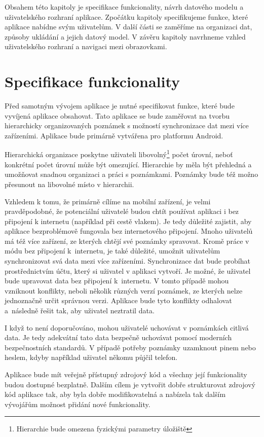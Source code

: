 \documentclass[czech, bc, kiv, he, iso690numb]{fasthesis}
\begin{document}
Obsahem této kapitoly je specifikace funkcionality, návrh datového modelu a uživatelského rozhraní aplikace. Zpočátku kapitoly specifikujeme funkce, které aplikace nabídne svým uživatelům. V další části se zaměříme na organizaci dat, způsoby ukládání a jejich datový model. V závěru kapitoly navrhneme vzhled uživatelského rozhraní a navigaci mezi obrazovkami.

\section{Specifikace funkcionality}

Před samotným vývojem aplikace je nutné specifikovat funkce, které bude vyvíjená aplikace obsahovat. Tato aplikace se bude zaměřovat na tvorbu hierarchicky organizovaných poznámek s možností synchronizace dat mezi více zařízeními. Aplikace bude primárně vytvářena pro platformu Android.

Hierarchická organizace poskytne uživateli libovolný\footnote{Hierarchie bude omezena fyzickými parametry úložiště} počet úrovní, neboť konkrétní počet úrovní může být omezující. Hierarchie by měla být přehledná a umožňovat snadnou organizaci a práci s poznámkami. Poznámky bude též možno přesunout na libovolné místo v hierarchii.

Vzhledem k tomu, že primárně cílíme na mobilní zařízení, je velmi pravděpodobné, že potenciální uživatelé budou chtít používat aplikaci i bez připojení k internetu (například při cestě vlakem). Je tedy důležité zajistit, aby aplikace bezproblémově fungovala bez internetového připojení. Mnoho uživatelů má též více zařízení, ze kterých chtějí své poznámky spravovat. Kromě práce v módu bez připojení k~internetu, je také důležité, umožnit uživatelům synchronizovat svá data mezi více zařízeními. Synchronizace dat bude probíhat prostřednictvím účtu, který si uživatel v aplikaci vytvoří. Je možné, že uživatel bude upravovat data bez připojení k~internetu. V tomto případě mohou vzniknout konflikty, neboli několik různých verzí poznámek, ze kterých nelze jednoznačně určit správnou verzi. Aplikace bude tyto konflikty odhalovat a~následně řešit tak, aby uživatel neztratil data.

I když to není doporučováno, mohou uživatelé uchovávat v poznámkách citlivá data. Je tedy adekvátní tato data bezpečně uchovávat pomocí moderních bezpečnostních standardů. V případě potřeby poznámky uzamknout pinem nebo heslem, kdyby například uživatel někomu půjčil telefon.

Aplikace bude mít veřejně přístupný zdrojový kód a všechny její funkcionality budou dostupné bezplatně. Dalším cílem je vytvořit dobře strukturovat zdrojový kód aplikace tak, aby byla dobře modifikovatelná a nabízela tak dalším vývojářům možnost přidání nové funkcionality.
\end{document}
